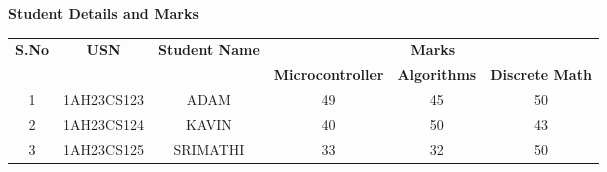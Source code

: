 \documentclass{article}
\begin{document}
	
	\begin{table}[h]
		\centering 
		\textbf{\Large Student Details and Marks}
		\vspace{0.1in}
		\begin{tabular}{|c|c|c|c|c|c|}
			\hline
			\multirow{2}{*}{\textbf{S.No}} & \multirow{2}{*}{\textbf{USN}} &
			\multirow{2}{*}{\textbf{Student Name}} & \multicolumn{3}{c|}{\textbf{Marks}} \\
			\cline{4-6}
			& & & \textbf{Microcontroller} & \textbf{Algorithms} & \textbf{Discrete Math} \\
			\hline
			1 & 1AH23CS123 & ADAM & 49 & 45 & 50 \\
			\hline
			2 & 1AH23CS124 & KAVIN & 40 & 50 & 43 \\
			\hline
			3 & 1AH23CS125 & SRIMATHI & 33 & 32 & 50 \\
			\hline
		\end{tabular}
	\end{table}
	
\end{document}
